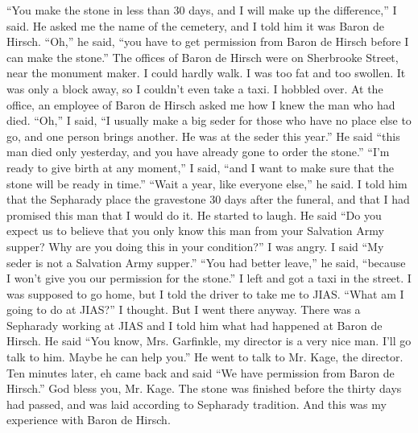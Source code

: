 “You make the stone in less than 30 days, and I will make up the difference,” I said. He asked me the name of the cemetery, and I told him it was Baron de Hirsch.
“Oh,” he said, “you have to get permission from Baron de Hirsch before I can make the stone.”
The offices of Baron de Hirsch were on Sherbrooke Street, near the monument maker. I could hardly walk. I was too fat and too swollen. It was only a block away, so I couldn’t even take a taxi. I hobbled over.
At the office, an employee of Baron de Hirsch asked me how I knew the man who had died.
“Oh,” I said, “I usually make a big seder for those who have no place else to go, and one person brings another. He was at the seder this year.”
He said “this man died only yesterday, and you have already gone to order the stone.”
“I’m ready to give birth at any moment,” I said, “and I want to make sure that the stone will be ready in time.”
“Wait a year, like everyone else,” he said.
I told him that the Sepharady place the gravestone 30 days after the funeral, and that I had promised this man that I would do it. He started to laugh.
He said “Do you expect us to believe that you only know this man from your Salvation Army supper? Why are you doing this in your condition?”
I was angry. I said “My seder is not a Salvation Army supper.”
“You had better leave,” he said, “because I won’t give you our permission for the stone.”
I left and got a taxi in the street. I was supposed to go home, but I told the driver to take me to JIAS. “What am I going to do at JIAS?” I thought. But I went there anyway.
There was a Sepharady working at JIAS and I told him what had happened at Baron de Hirsch. He said “You know, Mrs. Garfinkle, my director is a very nice man. I’ll go talk to him. Maybe he can help you.” He went to talk to Mr. Kage, the director. Ten minutes later, eh came back and said “We have permission from Baron de Hirsch.” God bless you, Mr. Kage.
The stone was finished before the thirty days had passed, and was laid according to Sepharady tradition. And this was my experience with Baron de Hirsch.

